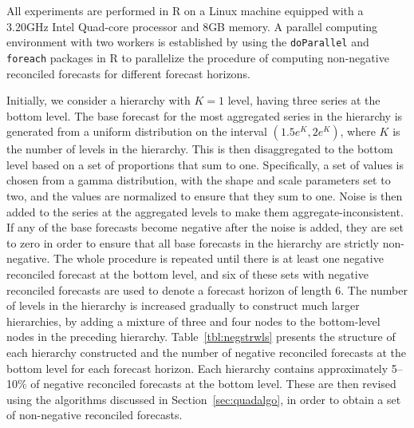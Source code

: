 \documentclass[twocolumn]{svjour3}
\begin{document}
All experiments are performed in R on a Linux machine equipped with a 3.20GHz Intel Quad-core processor and 8GB memory. A parallel computing environment with two workers is established by using the \texttt{doParallel} \citep{doparallel2015} and \texttt{foreach} \citep{foreach2015} packages in R to parallelize the procedure of computing non-negative reconciled forecasts for different forecast horizons.

Initially, we consider a hierarchy with $K=1$ level, having three series at the bottom level. The base forecast for the most aggregated series in the hierarchy is generated from a uniform distribution on the interval $(1.5e^{K}, 2e^{K})$, where $K$ is the number of levels in the hierarchy. This is then disaggregated to the bottom level based on a set of proportions that sum to one. Specifically, a set of values is chosen from a gamma distribution, with the shape and scale parameters set to two, and the values are normalized to ensure that they sum to one. Noise is then added to the series at the aggregated levels to make them aggregate-inconsistent. If any of the base forecasts become negative after the noise is added, they are set to zero in order to ensure that all base forecasts in the hierarchy are strictly non-negative. The whole procedure is repeated until there is at least one negative reconciled forecast at the bottom level, and six of these sets with negative reconciled forecasts are used to denote a forecast horizon of length 6. The number of levels in the hierarchy is increased gradually to construct much larger hierarchies, by adding a mixture of three and four nodes to the bottom-level nodes in the preceding hierarchy. Table~\ref{tbl:negstrwls} presents the structure of each hierarchy constructed and the number of negative reconciled forecasts at the bottom level for each forecast horizon. Each hierarchy contains approximately 5--10\% of negative reconciled forecasts at the bottom level. These are then revised using the algorithms discussed in Section~\ref{sec:quadalgo}, in order to obtain a set of non-negative reconciled forecasts.
\end{document}
